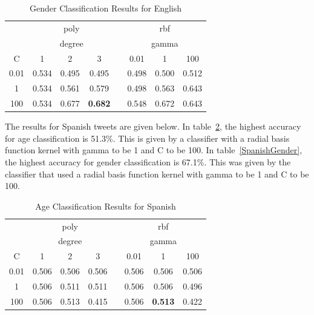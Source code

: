 \documentclass[conference]{IEEEtran}
\begin{document}
\begin{table}[!htbp]
\centering
\caption{Gender Classification Results for English}
\label{EnglishGender}
\setlength{\tabcolsep}{0.5em}
{\renewcommand{\arraystretch}{1.2}%
\begin{tabular}{c|ccccccc}
\toprule
     & \multicolumn{3}{c}{poly}       &  & \multicolumn{3}{c}{rbf}   \\
     & \multicolumn{3}{c}{degree}     &  & \multicolumn{3}{c}{gamma} \\
C    & 1     & 2     & 3              &  & 0.01    & 1       & 100   \\
\midrule
0.01 & 0.534 & 0.495 & 0.495          &  & 0.498   & 0.500   & 0.512 \\
1    & 0.534 & 0.561 & 0.579          &  & 0.498   & 0.563   & 0.643 \\
100  & 0.534 & 0.677 & \textbf{0.682} &  & 0.548   & 0.672   & 0.643 \\
\bottomrule
\end{tabular}
}
\end{table}

The results for Spanish tweets are given below. In table~\ref{SpanishAge}, the highest accuracy for age classification is 51.3\%. This is given by a classifier with a radial basis function kernel with gamma to be 1 and C to be 100. In table~\ref{SpanishGender}, the highest accuracy for gender classification is 67.1\%. This was given by the classifier that used a radial basis function kernel with gamma to be 1 and C to be 100. 
\begin{table}[!htbp]
\centering
\caption{Age Classification Results for Spanish}
\label{SpanishAge}
\setlength{\tabcolsep}{0.5em}
{\renewcommand{\arraystretch}{1.2}%
\begin{tabular}{c|ccccccc}
\toprule
     & \multicolumn{3}{c}{poly}   &  & \multicolumn{3}{c}{rbf}        \\
     & \multicolumn{3}{c}{degree} &  & \multicolumn{3}{c}{gamma}      \\
C    & 1       & 2       & 3      &  & 0.01  & 1              & 100   \\
\midrule
0.01 & 0.506   & 0.506   & 0.506  &  & 0.506 & 0.506          & 0.506 \\
1    & 0.506   & 0.511   & 0.511  &  & 0.506 & 0.506          & 0.496 \\
100  & 0.506   & 0.513   & 0.415  &  & 0.506 & \textbf{0.513} & 0.422 \\
\bottomrule
\end{tabular}
}
\end{table}
\end{document}
